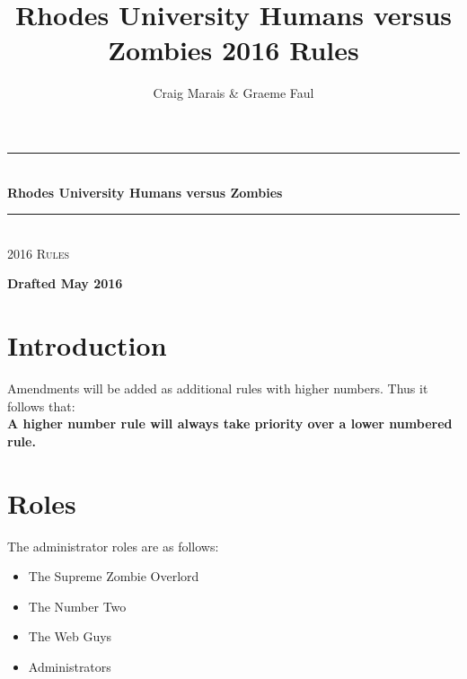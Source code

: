 \documentclass[a4paper,12pt]{article}
\title{Rhodes University Humans versus Zombies 2016 Rules}
\author{Craig Marais \& Graeme Faul}
\begin{document}


\begin{titlepage}
\pagestyle{empty}
\begin{center}




\rule{\linewidth}{0.5mm}
\\[5mm]

{\Large \bfseries Rhodes University Humans versus Zombies}
\rule{\linewidth}{0.5mm}
\\[5mm]

\textsc{\Large 2016 Rules}
\\[5mm]

\vfill

\textbf{Drafted May 2016}

\end{center}
\end{titlepage}

\newpage
\tableofcontents

\newpage
\section{Introduction}
Amendments will be added as additional rules with higher numbers. Thus it follows that:
\\
{\bf A higher number rule will always take priority over a lower numbered rule.}

\section{Roles}

The administrator roles are as follows:
\begin{itemize}
    \item {The Supreme Zombie Overlord}
    \item {The Number Two}
    \item {The Web Guys}
    \item {Administrators}
\end{itemize}
\end{document}
